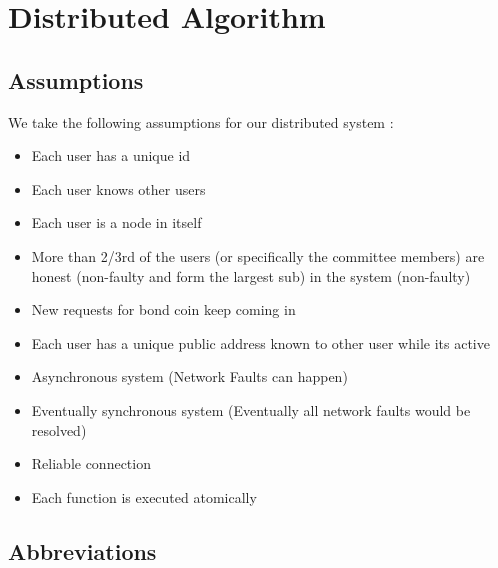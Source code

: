 
\chapter{Distributed Algorithm} %

\label{Chapter 5} %


\section{Assumptions}

We take the following assumptions for our distributed system :

{
\singlespacing
\begin{itemize}
    \item Each user has a unique id
    \item Each user knows other users
    \item Each user is a node in itself
    \item More than 2/3rd of the users (or specifically the committee members) are honest (non-faulty and form the largest sub) in the system (non-faulty)
    \item New requests for bond coin keep coming in
    \item Each user has a unique public address known to other user while its active
    \item Asynchronous system (Network Faults can happen)
    \item Eventually synchronous system (Eventually all network faults would be resolved)
    \item Reliable connection
    \item Each function is executed atomically
\end{itemize}
}

\section{Abbreviations}


